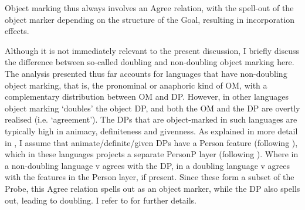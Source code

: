 \documentclass[output=paper
,modfonts
,nonflat]{langsci/langscibook}
\begin{document}
\begin{exe} 
	\ex \label{ex-vdwal:13}	 
	\xlist
	 \vspace{-0.5cm}
	\endxlist
\end{exe} 	\vspace{-0.2cm}
Object marking thus always involves an Agree relation, with the spell-out of the object marker depending on the structure of the Goal, resulting in incorporation effects.

Although it is not immediately relevant to the present discussion, I briefly discuss the difference between so-called doubling and non-doubling object marking here. The analysis presented thus far accounts for languages that have non-doubling object marking, that is, the pronominal or anaphoric kind of OM, with a complementary distribution between OM and DP. However, in other languages object marking ‘doubles’ the object DP, and both the OM and the DP are overtly realised (i.e. ‘agreement’). The DPs that are object-marked in such languages are typically high in animacy, definiteness and givenness. As explained in more detail in \citet{Van_der_Wal2015}, I assume that animate/definite/given DPs have a Person feature (following \citealt{Richards2008, Richards2015}), 
which in these languages projects a separate PersonP layer (following \citealt{Hoehn2017}).  
Where in a non-doubling language v agrees with the DP, in a doubling language v agrees with the features in the Person layer, if present. Since these form a subset of the Probe, this Agree relation spells out as an object marker, while the DP also spells out, leading to doubling. I refer to \citet{Van_der_Wal2015} for further details.
\end{document}

